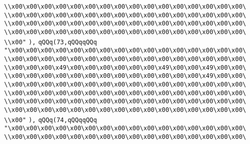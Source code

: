 \verb|\\x00\x00\x00\x00\x00\x00\x00\x00\x00\x00\x00\x00\x00\x00\x00\x00\|\newline
\verb|\\x00\x00\x00\x00\x00\x00\x00\x00\x00\x00\x00\x00\x00\x00\x00\x00\|\newline
\verb|\\x00\x00\x00\x00\x00\x00\x00\x00\x00\x00\x00\x00\x00\x00\x00\x00\|\newline
\verb|\\x00\x00\x00\x00\x00\x00\x00\x00\x00\x00\x00\x00\x00\x00\x00\x00\|\newline
\verb|\\x00"|\newline
\verb|),|\newline
\verb|qQQq(73,qQQqqQQq|\newline
\verb|"\x00\x00\x00\x00\x00\x00\x00\x00\x00\x00\x00\x00\x00\x00\x00\x00\|\newline
\verb|\\x00\x00\x00\x00\x00\x00\x00\x00\x00\x00\x00\x00\x00\x00\x00\x00\|\newline
\verb|\\x00\x00\x00\x49\x00\x00\x00\x00\x00\x00\x49\x00\x00\x49\x00\x00\|\newline
\verb|\\x00\x00\x00\x00\x00\x00\x00\x00\x00\x00\x00\x00\x00\x49\x00\x00\|\newline
\verb|\\x00\x00\x00\x00\x00\x00\x00\x00\x00\x00\x00\x00\x00\x00\x00\x00\|\newline
\verb|\\x00\x00\x00\x00\x00\x00\x00\x00\x00\x00\x00\x00\x00\x00\x00\x00\|\newline
\verb|\\x00\x00\x00\x00\x00\x00\x00\x00\x00\x00\x00\x00\x00\x00\x00\x00\|\newline
\verb|\\x00\x00\x00\x00\x00\x00\x00\x00\x00\x00\x00\x00\x00\x00\x00\x00\|\newline
\verb|\\x00"|\newline
\verb|),|\newline
\verb|qQQq(74,qQQqqQQq|\newline
\verb|"\x00\x00\x00\x00\x00\x00\x00\x00\x00\x00\x00\x00\x00\x00\x00\x00\|\newline
\verb|\\x00\x00\x00\x00\x00\x00\x00\x00\x00\x00\x00\x00\x00\x00\x00\x00\|\newline
